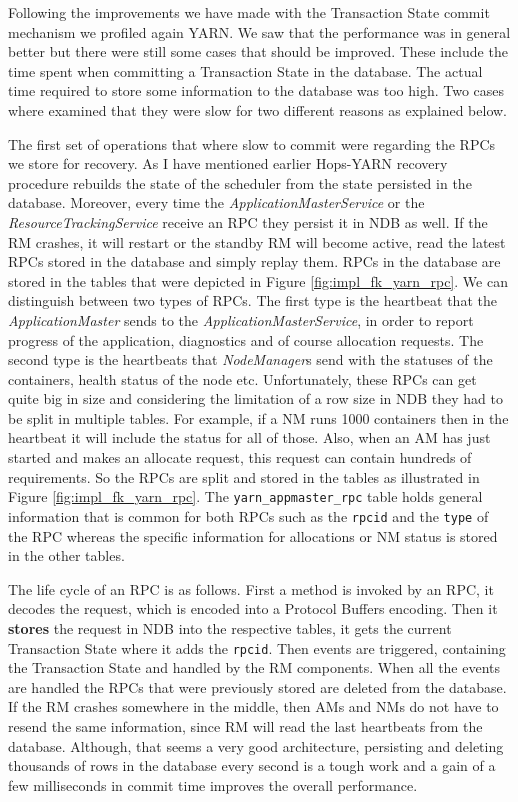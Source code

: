 Following the improvements we have made with the Transaction State
commit mechanism we profiled again YARN. We saw that the performance
was in general better but there were still some cases that should be
improved. These include the time spent when committing a Transaction
State in the database. The actual time required to store some
information to the database was too high. Two cases where examined that
they were slow for two different reasons as explained below.

The first set of operations that where slow to commit were regarding
the RPCs we store for recovery. As I have mentioned earlier Hops-YARN
recovery procedure rebuilds the state of the scheduler from the state
persisted in the database. Moreover, every time the
\emph{ApplicationMasterService} or the \emph{ResourceTrackingService}
receive an RPC they persist it in NDB as well. If the RM crashes, it
will restart or the standby RM will become active, read the latest
RPCs stored in the database and simply replay them. RPCs in the
database are stored in the tables that were depicted in Figure
\ref{fig:impl_fk_yarn_rpc}. We can distinguish between two types of
RPCs. The first type is the heartbeat that the
\emph{ApplicationMaster} sends to the \emph{ApplicationMasterService},
in order to report progress of the application, diagnostics and of
course allocation requests. The second type is the heartbeats that
\emph{NodeManager}s send with the statuses of the containers, health
status of the node etc. Unfortunately, these RPCs can get quite big
in size and considering the limitation of a row size in NDB they had
to be split in multiple tables. For example, if a NM runs 1000
containers then in the heartbeat it will include the status for all of
those. Also, when an AM has just started and makes an allocate
request, this request can contain hundreds of requirements. So the
RPCs are split and stored in the tables as illustrated in Figure
\ref{fig:impl_fk_yarn_rpc}. The \texttt{yarn\_appmaster\_rpc} table
holds general information that is common for both RPCs such as the
\texttt{rpcid} and the \texttt{type} of the RPC whereas the
specific information for allocations or NM status is stored in the
other tables.

The life cycle of an RPC is as follows. First a method is invoked by
an RPC, it decodes the request, which is encoded into a Protocol
Buffers encoding. Then it \textbf{stores} the request in NDB into the
respective tables, it gets the current Transaction State where it adds
the \texttt{rpcid}. Then events are triggered, containing the
Transaction State and handled by the RM components. When all the
events are handled the RPCs that were previously stored are deleted
from the database. If the RM crashes somewhere in the middle, then AMs
and NMs do not have to resend the same information, since RM will read
the last heartbeats from the database. Although, that seems a very
good architecture, persisting and deleting thousands of rows in the
database every second is a tough work and a gain of a few milliseconds
in commit time improves the overall performance.

